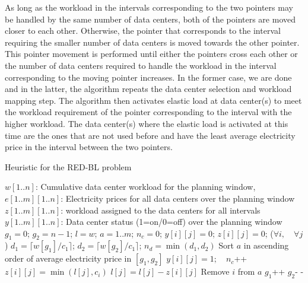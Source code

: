 As long as the workload in the intervals corresponding to the two pointers may be handled by the same number of data centers, both of the pointers are moved closer to each other. Otherwise, the pointer that corresponds to the interval requiring the smaller number of data centers is moved towards the other pointer. This pointer movement is performed until either the pointers cross each other or the number of data centers required to handle the workload in the interval corresponding to the moving pointer increases. In the former case, we are done and in the latter, the algorithm repeats the data center selection and workload mapping step. The algorithm then activates elastic load at data center(s) to meet the workload requirement of the pointer corresponding to the interval with the higher workload. The data center(s) where the elastic load is activated at this time are the ones that are not used before and have the least average electricity price in the interval between the two pointers.

\begin{algorithm}
\caption{Heuristic for the RED-BL problem}
\label{algo:heur1}
\begin{algorithmic}[1]
\REQUIRE $w[1..n]$: Cumulative data center workload for the planning window,\\$e[1..m][1..n]$: Electricity prices for all data centers over the planning window
\ENSURE $z[1..m][1..n]$: workload assigned to the data centers for all intervals\\
$y[1..m][1..n]$: Data center status (1=on/0=off) over the planning window
\STATE $g_1 = 0$; \quad $g_2 = n-1$; \quad $l = w$; \quad $a = 1..m$; \quad $n_c = 0$;
\STATE \quad $y[i][j]=0$; \quad $z[i][j]=0$; \quad ($\forall i, \quad \forall j$)
\REPEAT
	\STATE $d_1 = \lceil w[g_1]/c_1 \rceil$; \quad $d_2 = \lceil w[g_2]/c_1 \rceil$; \quad $n_d = \min(d_1, d_2)$
		\STATE Sort $a$ in ascending order of average electricity price in $[g_1, g_2]$
				\STATE $y[i][j] = 1; \quad n_c$++
				\STATE $z[i][j]=\min(l[j], c_i)$
				\STATE $l[j] = l[j] - z[i][j]$				
				\STATE Remove $i$ from $a$
			\ENDFOR
		\ENDFOR
	\ENDIF
		\REPEAT
			\STATE $g_1$++
		\REPEAT
			\STATE $g_2$- -
\end{algorithmic}
\end{algorithm}


